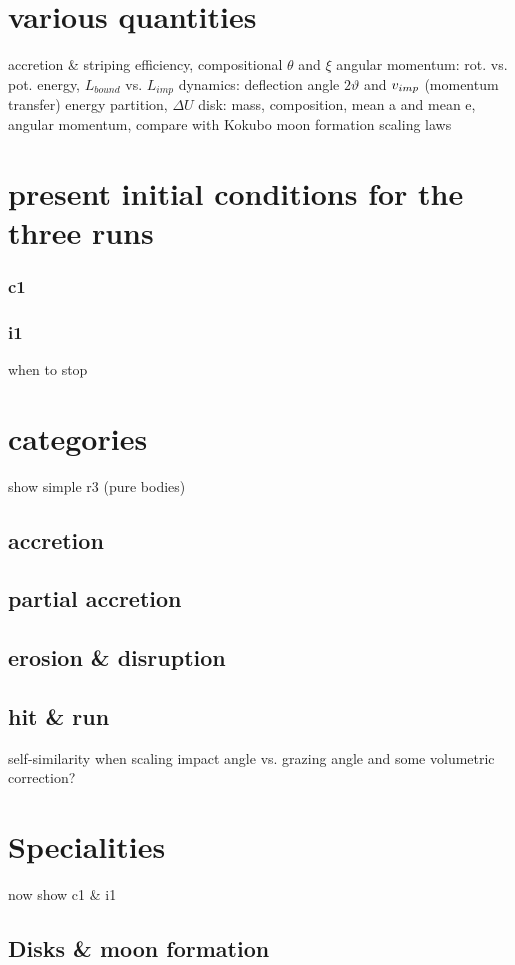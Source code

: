 \section{various quantities}
accretion \& striping efficiency, compositional $\theta$ and $\xi$
angular momentum: rot. vs. pot. energy, $L_{bound}$ vs. $L_{imp}$
dynamics: deflection angle $2 \vartheta$ and $v_{imp}$ (momentum transfer)
energy partition, $\Delta U$
disk: mass, composition, mean a and mean e, angular momentum, compare with Kokubo moon formation scaling laws


\section{present initial conditions for the three runs}
\subsubsection{c1}
\subsubsection{i1}
when to stop

\section{\SSC categories}
show simple r3 (pure bodies)


\subsection{accretion}
\subsection{partial accretion}
\subsection{erosion \& disruption}
\subsection{hit \& run}


self-similarity when scaling impact angle vs. grazing angle and some volumetric correction?

\section{Specialities}
now show c1 \& i1
\subsection{Disks \& moon formation}

